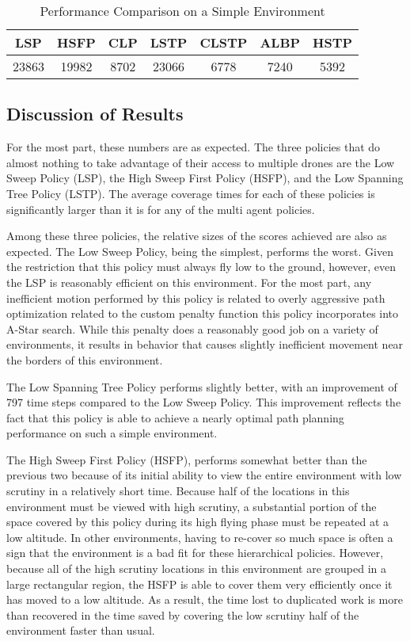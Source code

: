 \begin{table}[h]
\begin{center}
 \begin{tabular}{||c c c c c c c ||}
 \hline
 LSP   & HSFP  & CLP  & LSTP  & CLSTP & ALBP & HSTP \\
 \hline
 23863 & 19982 & 8702 & 23066 & 6778  & 7240 & 5392 \\
 \hline
 \end{tabular}
\end{center}
\caption{Performance Comparison on a Simple Environment}
\end{table}

\subsection{Discussion of Results}

For the most part, these numbers are as expected. The three policies that do almost nothing to take advantage of their access to multiple drones are the Low Sweep Policy (LSP), the High Sweep First Policy (HSFP), and the Low Spanning Tree Policy (LSTP). The average coverage times for each of these policies is significantly larger than it is for any of the multi agent policies.

Among these three policies, the relative sizes of the scores achieved are also as expected. The Low Sweep Policy, being the simplest, performs the worst. Given the restriction that this policy must always fly low to the ground, however, even the LSP is reasonably efficient on this environment. For the most part, any inefficient motion performed by this policy is related to overly aggressive path optimization related to the custom penalty function this policy incorporates into A-Star search. While this penalty does a reasonably good job on a variety of environments, it results in behavior that causes slightly inefficient movement near the borders of this environment.

The Low Spanning Tree Policy performs slightly better, with an improvement of 797 time steps compared to the Low Sweep Policy. This improvement reflects the fact that this policy is able to achieve a nearly optimal path planning performance on such a simple environment.

The High Sweep First Policy (HSFP), performs somewhat better than the previous two because of its initial ability to view the entire environment with low scrutiny in a relatively short time. Because half of the locations in this environment must be viewed with high scrutiny, a substantial portion of the space covered by this policy during its high flying phase must be repeated at a low altitude. In other environments, having to re-cover so much space is often a sign that the environment is a bad fit for these hierarchical policies. However, because all of the high scrutiny locations in this environment are grouped in a large rectangular region, the HSFP is able to cover them very efficiently once it has moved to a low altitude. As a result, the time lost to duplicated work is more than recovered in the time saved by covering the low scrutiny half of the environment faster than usual.

